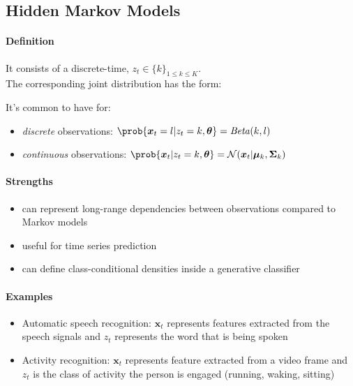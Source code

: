 \subsection{Hidden Markov Models}
\paragraph{Definition}
It consists of a discrete-time,  
$z_{t}\in\{k\}_{1\leq k\leq K}$.\\
The corresponding joint distribution has the form:
\begin{center}
\end{center}

It's common to have for:
\begin{itemize}
    \item \emph{discrete} observations: $\prob{\bm{x}_{t}=l|z_{t}=k,\bm{\theta}} = \text{\emph{Beta}}
        (k,l)$
    \item \emph{continuous} observations: $\prob{\bm{x}_{t}|z_{t}=k,\bm{\theta}} = \mathcal{N}(\bm{x}
        _{t}|\bm{\mu}_{k},\bm{\Sigma}_{k})$
\end{itemize}

\paragraph{Strengths}
\begin{itemize}
    \item can represent long-range dependencies between observations compared to Markov models
    \item useful for time series prediction
    \item can define class-conditional densities inside a generative classifier
\end{itemize}

\paragraph{Examples}
\begin{itemize}
    \item Automatic speech recognition: $\bm{x}_{t}$ represents features extracted from the speech 
        signals and $z_{t}$ represents the word that is being spoken
    \item Activity recognition: $\bm{x}_{t}$ represents feature extracted from a video frame and 
        $z_{t}$ is the class of activity the person is engaged (running, waking, sitting)
\end{itemize}

